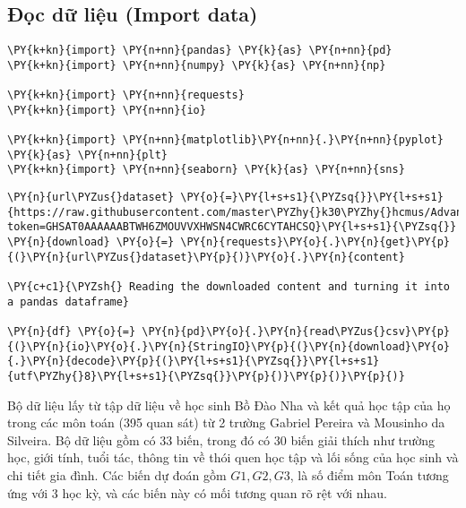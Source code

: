     \hypertarget{ux111ux1ecdc-dux1eef-liux1ec7u-import-data}{%
\subsection{Đọc dữ liệu (Import
data)}\label{ux111ux1ecdc-dux1eef-liux1ec7u-import-data}}

    \begin{tcolorbox}[breakable, size=fbox, boxrule=1pt, pad at break*=1mm,colback=cellbackground, colframe=cellborder]
\begin{Verbatim}[commandchars=\\\{\}]
\PY{k+kn}{import} \PY{n+nn}{pandas} \PY{k}{as} \PY{n+nn}{pd}
\PY{k+kn}{import} \PY{n+nn}{numpy} \PY{k}{as} \PY{n+nn}{np}

\PY{k+kn}{import} \PY{n+nn}{requests}
\PY{k+kn}{import} \PY{n+nn}{io}

\PY{k+kn}{import} \PY{n+nn}{matplotlib}\PY{n+nn}{.}\PY{n+nn}{pyplot} \PY{k}{as} \PY{n+nn}{plt}
\PY{k+kn}{import} \PY{n+nn}{seaborn} \PY{k}{as} \PY{n+nn}{sns}
\end{Verbatim}
\end{tcolorbox}

    \begin{tcolorbox}[breakable, size=fbox, boxrule=1pt, pad at break*=1mm,colback=cellbackground, colframe=cellborder]
\begin{Verbatim}[commandchars=\\\{\}]
\PY{n}{url\PYZus{}dataset} \PY{o}{=}\PY{l+s+s1}{\PYZsq{}}\PY{l+s+s1}{https://raw.githubusercontent.com/master\PYZhy{}k30\PYZhy{}hcmus/AdvanceStat4DS/master/data/student\PYZus{}scores.csv?token=GHSAT0AAAAAABTWH6ZMOUVVXHWSN4CWRC6CYTAHCSQ}\PY{l+s+s1}{\PYZsq{}}
\PY{n}{download} \PY{o}{=} \PY{n}{requests}\PY{o}{.}\PY{n}{get}\PY{p}{(}\PY{n}{url\PYZus{}dataset}\PY{p}{)}\PY{o}{.}\PY{n}{content}

\PY{c+c1}{\PYZsh{} Reading the downloaded content and turning it into a pandas dataframe}

\PY{n}{df} \PY{o}{=} \PY{n}{pd}\PY{o}{.}\PY{n}{read\PYZus{}csv}\PY{p}{(}\PY{n}{io}\PY{o}{.}\PY{n}{StringIO}\PY{p}{(}\PY{n}{download}\PY{o}{.}\PY{n}{decode}\PY{p}{(}\PY{l+s+s1}{\PYZsq{}}\PY{l+s+s1}{utf\PYZhy{}8}\PY{l+s+s1}{\PYZsq{}}\PY{p}{)}\PY{p}{)}\PY{p}{)}
\end{Verbatim}
\end{tcolorbox}

    Bộ dữ liệu lấy từ tập dữ liệu về học sinh Bồ Đào Nha và kết quả học tập
của họ trong các môn toán (395 quan sát) từ 2 trường Gabriel Pereira và
Mousinho da Silveira. Bộ dữ liệu gồm có 33 biến, trong đó có 30 biến
giải thích như trường học, giới tính, tuổi tác, thông tin về thói quen
học tập và lối sống của học sinh và chi tiết gia đình. Các biến dự đoán
gồm \(G1, G2, G3\), là số điểm môn Toán tương ứng với 3 học kỳ, và các
biến này có mối tương quan rõ rệt với nhau.

